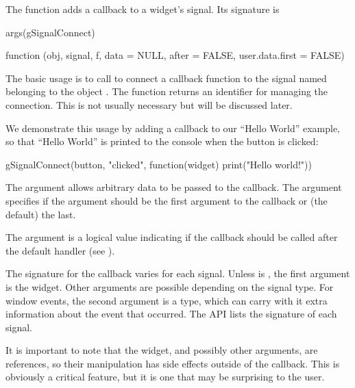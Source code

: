 The  function adds a callback to a widget's
signal. Its signature is
\begin{Schunk}
\begin{Sinput}
 args(gSignalConnect)
\end{Sinput}
\end{Schunk}
\begin{Soutput}
function (obj, signal, f, data = NULL, after = FALSE, 
          user.data.first = FALSE) 
\end{Soutput}
%
The basic usage is to call  to connect a
callback function  to the signal named
 belonging to the object
. The function returns an identifier for
managing the connection. This is not usually necessary but will be
discussed later.

We demonstrate this usage by adding a callback to our ``Hello World''
example, so that ``Hello World'' is printed to the console when the
button is clicked:
\begin{Schunk}
\begin{Sinput}
 gSignalConnect(button, "clicked", 
                function(widget) print("Hello world!"))
\end{Sinput}
\end{Schunk}
%

The  argument allows arbitrary data to
be passed to the callback.  The
 argument specifies if the
 argument should be the first argument
to the callback or (the default) the last.

The  argument is a logical value
indicating if the callback should be called after the default handler
(see ).

The signature for the callback varies for each signal. Unless
 is , the first argument is the
widget. Other arguments are possible depending on the signal type. For
window events, the second argument is a  type, which
can carry with it extra information about the event that occurred. The
\GTK\/ API lists the signature of each signal.

It is important to note that the widget, and possibly other arguments,
are references, so their manipulation has side effects outside of the
callback. This is obviously a critical feature, but it is one that
may be surprising to the \R\/ user.


